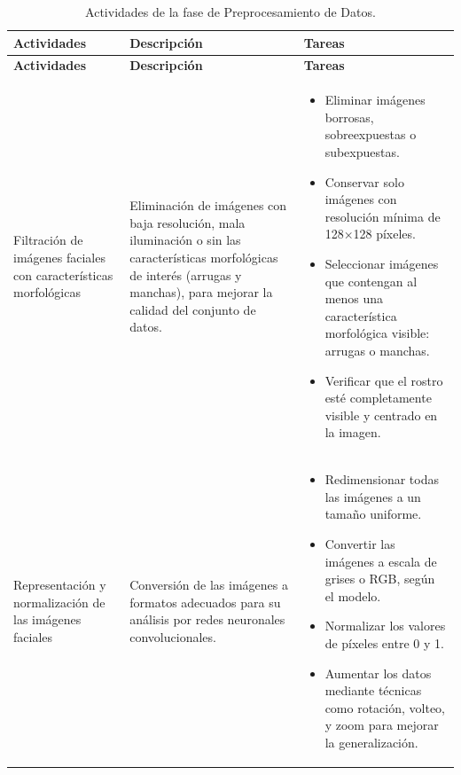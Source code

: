 \begin{longtable}{>{\raggedright\arraybackslash}p{4cm} >{\raggedright\arraybackslash}p{4cm} >{\raggedright\arraybackslash}p{5cm}}
    \caption{Actividades de la fase de Preprocesamiento de Datos.}
    \label{tabla:preprocesamiento}\\
    \toprule
    \textbf{Actividades} & \textbf{Descripción} & \textbf{Tareas} \\
    \midrule
    \endfirsthead

    \toprule
    \textbf{Actividades} & \textbf{Descripción} & \textbf{Tareas} \\
    \midrule
    \endhead

    \bottomrule
    \endfoot

    \bottomrule
    \endlastfoot

    Filtración de imágenes faciales con características morfológicas & Eliminación de imágenes con baja resolución, mala iluminación o sin las características morfológicas de interés (arrugas y manchas), para mejorar la calidad del conjunto de datos. & 
    \begin{itemize}
        \item Eliminar imágenes borrosas, sobreexpuestas o subexpuestas.
        \item Conservar solo imágenes con resolución mínima de 128×128 píxeles.
        \item Seleccionar imágenes que contengan al menos una característica morfológica visible: arrugas o manchas.
        \item Verificar que el rostro esté completamente visible y centrado en la imagen.
    \end{itemize} \\

    Representación y normalización de las imágenes faciales & Conversión de las imágenes a formatos adecuados para su análisis por redes neuronales convolucionales. & 
    \begin{itemize}
        \item Redimensionar todas las imágenes a un tamaño uniforme.
        \item Convertir las imágenes a escala de grises o RGB, según el modelo.
        \item Normalizar los valores de píxeles entre 0 y 1.
        \item Aumentar los datos mediante técnicas como rotación, volteo, y zoom para mejorar la generalización.
    \end{itemize} \\

\end{longtable}


